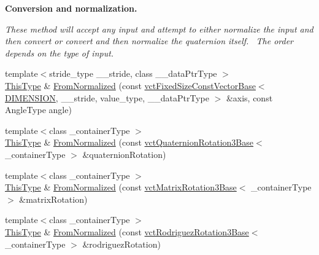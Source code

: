 \begin{Indent}{\bf Conversion and normalization.}\par
{\em These method will accept any input and attempt to either normalize the input and then convert or convert and then normalize the quaternion itself.~\newline
The order depends on the type of input. }\begin{DoxyCompactItemize}
\item 
{\footnotesize template$<$stride\+\_\+type \+\_\+\+\_\+stride, class \+\_\+\+\_\+data\+Ptr\+Type $>$ }\\\hyperlink{classvct_axis_angle_rotation3_af654a8037b7b82a378f69cb1bfd9b8dd}{This\+Type} \& \hyperlink{classvct_axis_angle_rotation3_a50c217d61a517bda838d9b1cbe2aaa5d}{From\+Normalized} (const \hyperlink{classvct_fixed_size_const_vector_base}{vct\+Fixed\+Size\+Const\+Vector\+Base}$<$ \hyperlink{group__cisst_vector_gga278b4a98a62e4f5ff42ce055836240a9a778d22dfe29402d2cfdd381c1b870285}{D\+I\+M\+E\+N\+S\+I\+O\+N}, \+\_\+\+\_\+stride, value\+\_\+type, \+\_\+\+\_\+data\+Ptr\+Type $>$ \&axis, const Angle\+Type angle)
\item 
{\footnotesize template$<$class \+\_\+container\+Type $>$ }\\\hyperlink{classvct_axis_angle_rotation3_af654a8037b7b82a378f69cb1bfd9b8dd}{This\+Type} \& \hyperlink{classvct_axis_angle_rotation3_ad11bae97a565e6c5680a3030fc6ca015}{From\+Normalized} (const \hyperlink{classvct_quaternion_rotation3_base}{vct\+Quaternion\+Rotation3\+Base}$<$ \+\_\+container\+Type $>$ \&quaternion\+Rotation)
\item 
{\footnotesize template$<$class \+\_\+container\+Type $>$ }\\\hyperlink{classvct_axis_angle_rotation3_af654a8037b7b82a378f69cb1bfd9b8dd}{This\+Type} \& \hyperlink{classvct_axis_angle_rotation3_a1b960664eabdb59b342fd81e5c9d1564}{From\+Normalized} (const \hyperlink{classvct_matrix_rotation3_base}{vct\+Matrix\+Rotation3\+Base}$<$ \+\_\+container\+Type $>$ \&matrix\+Rotation)
\item 
{\footnotesize template$<$class \+\_\+container\+Type $>$ }\\\hyperlink{classvct_axis_angle_rotation3_af654a8037b7b82a378f69cb1bfd9b8dd}{This\+Type} \& \hyperlink{classvct_axis_angle_rotation3_a7233e3bbd1724b7d69ea4fcdc7ddc3e5}{From\+Normalized} (const \hyperlink{classvct_rodriguez_rotation3_base}{vct\+Rodriguez\+Rotation3\+Base}$<$ \+\_\+container\+Type $>$ \&rodriguez\+Rotation)
\end{DoxyCompactItemize}
\end{Indent}
